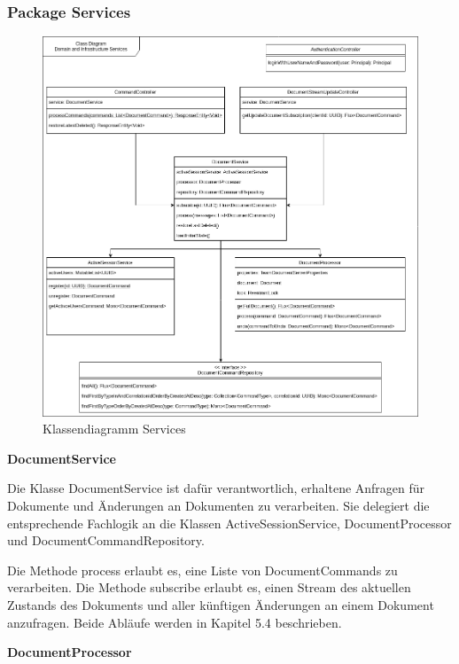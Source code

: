 \subsubsection{Package Services}

\begin{figure}[h]
    \centering
    \begin{minipage}[b]{0.8\textwidth}
        \includegraphics[width=\textwidth]{graphics/class-be.drawio}
        \caption{Klassendiagramm Services}
    \end{minipage}
\end{figure}


\textbf{DocumentService}

Die Klasse DocumentService ist dafür verantwortlich, erhaltene Anfragen für Dokumente und Änderungen an Dokumenten zu verarbeiten.
Sie delegiert die entsprechende Fachlogik an die Klassen ActiveSessionService, DocumentProcessor und DocumentCommandRepository.

Die Methode process erlaubt es, eine Liste von DocumentCommands zu verarbeiten.
Die Methode subscribe erlaubt es, einen Stream des aktuellen Zustands des Dokuments und aller künftigen Änderungen an einem Dokument anzufragen.
Beide Abläufe werden in Kapitel 5.4 beschrieben.

\textbf{DocumentProcessor}

